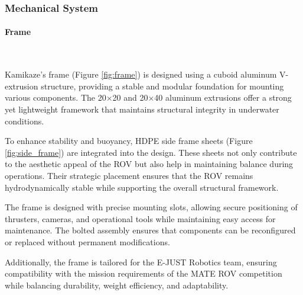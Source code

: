\subsubsection{Mechanical System}

\paragraph{Frame} \ \\
\vspace{-0.5cm}

Kamikaze’s frame (Figure \ref{fig:frame}) is designed using a cuboid aluminum V-extrusion structure, providing a stable and modular foundation for mounting various components. The 20×20 and 20×40 aluminum extrusions offer a strong yet lightweight framework that maintains structural integrity in underwater conditions.

\hspace{10pt} To enhance stability and buoyancy, HDPE side frame sheets (Figure \ref{fig:side_frame}) are integrated into the design. These sheets not only contribute to the aesthetic appeal of the ROV but also help in maintaining balance during operations. Their strategic placement ensures that the ROV remains hydrodynamically stable while supporting the overall structural framework.

\hspace{10pt} The frame is designed with precise mounting slots, allowing secure positioning of thrusters, cameras, and operational tools while maintaining easy access for maintenance. The bolted assembly ensures that components can be reconfigured or replaced without permanent modifications.

\hspace{10pt} Additionally, the frame is tailored for the E-JUST Robotics team, ensuring compatibility with the mission requirements of the MATE ROV competition while balancing durability, weight efficiency, and adaptability.

